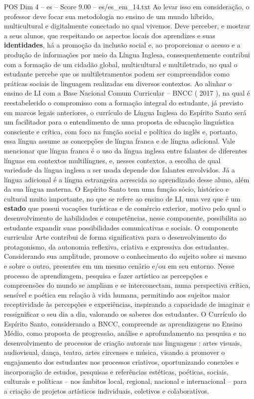 \begin{textsample}{POS Dim 4 – es – Score 9.00 – es/es\_em\_14.txt}
Ao levar isso em consideração, o professor deve focar sua metodologia no ensino de um mundo híbrido, multicultural e digitalmente conectado no qual vivemos.
Deve perceber, e mostrar a seus alunos, que respeitando os aspectos locais dos aprendizes e suas \textbf{identidades}, há a promoção da inclusão social e, ao proporcionar o acesso e a produção de informações por meio da Língua Inglesa, consequentemente contribui com a formação de um cidadão global, multicultural e multiletrado, no qual o estudante percebe que os multiletramentos podem ser compreendidos como práticas sociais de linguagem realizadas em diversos contextos.
Ao alinhar o ensino de LI com a Base Nacional Comum Curricular – BNCC ( 2017 ), na qual é reestabelecido o compromisso com a formação integral do estudante, já previsto em marcos legais anteriores, o currículo de Língua Inglesa do Espírito Santo será um facilitador para o entendimento de uma proposta de educação linguística consciente e crítica, com foco na função social e política do inglês e, portanto, essa língua assume as concepções de língua franca e de língua adicional.
Vale mencionar que língua franca é o uso da língua inglesa entre falantes de diferentes línguas em contextos multilíngues, e, nesses contextos, a escolha de qual variedade da língua inglesa a ser usada depende dos falantes envolvidos.
Já a língua adicional é a língua estrangeira acrescida ao aprendizado desse aluno, além da sua língua materna.
O Espírito Santo tem uma função sócio, histórico e cultural muito importante, no que se refere ao ensino de LI, uma vez que é um \textbf{estado} que possui vocações turísticas e de comércio exterior, motivo pelo qual o desenvolvimento de habilidades e competências, nesse componente, possibilita ao estudante expandir suas possibilidades comunicativas e sociais.
O componente curricular Arte contribui de forma significativa para o desenvolvimento do protagonismo, da autonomia reflexiva, criativa e expressiva dos estudantes.
Considerando sua amplitude, promove o conhecimento do sujeito sobre si mesmo e sobre o outro, presentes em um mesmo cenário e/ou em seu entorno.
Nesse processo de aprendizagem, pesquisa e fazer artístico as percepções e compreensões do mundo se ampliam e se interconectam, numa perspectiva crítica, sensível e poética em relação à vida humana, permitindo aos sujeitos maior receptividade às percepções e experiências, inspirando a capacidade de imaginar e ressignificar o seu dia a dia, valorando os saberes dos estudantes.
O Currículo do Espírito Santo, considerando a BNCC, compreende as aprendizagens no Ensino Médio, como proposta de progressão, análise e aprofundamento na pesquisa e no desenvolvimento de processos de criação autorais nas linguagens : artes visuais, audiovisual, dança, teatro, artes circenses e música, visando a promover o engajamento dos estudantes nos processos criativos, oportunizando conexões e incorporação de estudos, pesquisas e referências estéticas, poéticas, sociais, culturais e políticas – nos âmbitos local, regional, nacional e internacional – para a criação de projetos artísticos individuais, coletivos e colaborativos.

\end{textsample}
